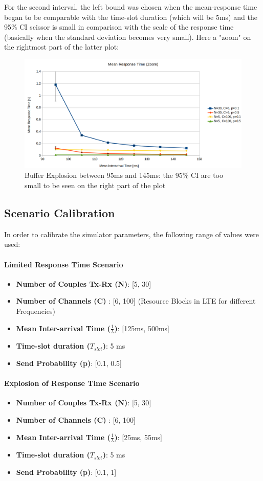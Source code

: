 For the second interval, the left bound was chosen when the mean-response time began to be comparable with the time-slot duration (which will be 5ms) and the 95\% CI scissor is small in comparison with the scale of the response time (basically when the standard deviation becomes very small). Here a "zoom" on the rightmost part of the latter plot:
\begin{figure}[H]
	\centering
	\includegraphics[width=\textwidth]{img/BufferExplosionZoom.png}
	\caption{Buffer Explosion between 95ms and 145ms: the 95\% CI are too small to be seen on the right part of the plot}
	\label {img: bufferExplosion}
\end{figure}

\subsection{Scenario Calibration}
In order to calibrate the simulator parameters, the following range of values were used:

\paragraph{Limited Response Time Scenario}
\begin{itemize}
	\item \textbf{Number of Couples Tx-Rx (N)}: [5, 30]
	\item \textbf{Number of Channels (C)} : [6, 100] (Resource Blocks in LTE for different Frequencies)
	\item \textbf{Mean Inter-arrival Time ($\frac{1}{\lambda}$)}: [125ms, 500ms]  
	\item \textbf{Time-slot duration ($T_{slot}$)}: 5 ms
	\item \textbf{Send Probability (p)}: [0.1, 0.5] 
\end{itemize}

\paragraph{Explosion of Response Time Scenario}
\begin{itemize}
	\item \textbf{Number of Couples Tx-Rx (N)}: [5, 30]
	\item \textbf{Number of Channels (C)} : [6, 100]
	\item \textbf{Mean Inter-arrival Time ($\frac{1}{\lambda}$)}: [25ms, 55ms] 
	\item \textbf{Time-slot duration ($T_{slot}$)}: 5 ms
	\item \textbf{Send Probability (p)}: [0.1, 1] 
\end{itemize}

